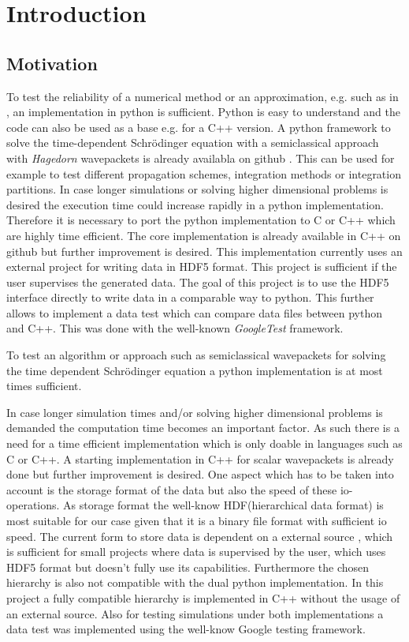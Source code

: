 \chapter{Introduction}

\section{Motivation}
To test the reliability of a numerical method or an approximation, e.g. such as in \cite{B_bachelor_thesis}, an implementation in python is sufficient. Python is easy to understand and the code can also be used as a base e.g. for a C++ version. A python framework to solve the time-dependent Schr\"odinger equation with a semiclassical approach with \textit{Hagedorn} wavepackets is already availabla on github \cite{waveblocksnd}. This can be used for example to test different propagation schemes, integration methods or integration partitions. In case longer simulations or solving higher dimensional problems is desired the execution time could increase rapidly in a python implementation. Therefore it is necessary to port the python implementation to C or C++ which are highly time efficient. The core implementation is already available in C++ on github \cite{libwaveblocks} but further improvement is desired. This implementation currently uses an external project \cite{eigen3-hdf5} for writing data in HDF5 format. This project is sufficient if the user supervises the generated data. The goal of this project is to use the HDF5 interface \cite{hdf5cppd} directly to write data in a comparable way to python. This further allows to implement a data test which can compare data files between python and C++. This was done with the well-known \textit{GoogleTest} framework.



To test an algorithm or approach such as semiclassical wavepackets \cite{B_bachelor_thesis} for solving the time dependent Schr\"odinger equation a python implementation \cite{waveblocksnd} is at most times sufficient. 

In case longer simulation times and/or solving higher dimensional problems is demanded the computation time becomes an important factor. As such there is a need for a time efficient implementation which is only doable in languages such as C or C++. 
A starting implementation in C++ for scalar wavepackets is already done \cite{libwaveblocks} but further improvement is desired. 
One aspect which has to be taken into account is the storage format of the data but also the speed of these io-operations. 
As storage format the well-know HDF(hierarchical data format) is most suitable for our case given that it is a binary file format with sufficient io speed. 
The current form to store data is dependent on a external source \cite{eigen3-hdf5}, which is sufficient for small projects where data is supervised by the user, which uses HDF5 format but doesn't fully use its capabilities. 
Furthermore the chosen hierarchy is also not compatible with the dual python implementation. 
In this project a fully compatible hierarchy is implemented in C++ without the usage of an external source. 
Also for testing simulations under both implementations a data test was implemented using the well-know Google testing framework.

